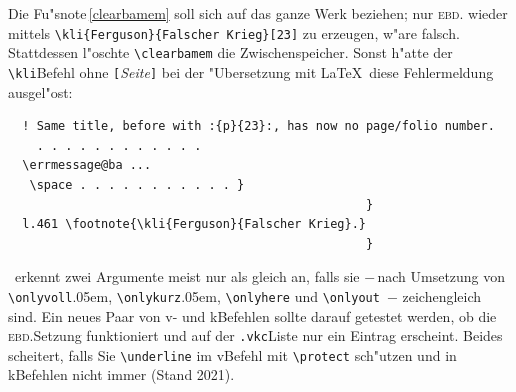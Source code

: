 \documentclass[12pt,a4paper]{article}
\begin{document}
\noindent 
Die Fu"snote\,\ref{clearbamem} soll sich auf das ganze 
Werk beziehen; nur \textsc{ebd.} \hspace{-.05em}wieder mittels 
\verb|\kli{Ferguson}{Falscher Krieg}[23]| \hspace{.05em}zu erzeugen, 
w"are falsch. Stattdessen l"oschte \hspace{-.025em}\verb|\clearbamem| die 
Zwischenspeicher. Sonst h"atte der \hspace{-.05em}\verb|\kli|\hy Befehl 
ohne \verb|[|\textit{Seite}\verb|]| bei der "Ubersetzung mit \LaTeX\ 
diese Fehlermeldung ausgel"ost:

\vspace{-0.25ex}\label{before}
{\scriptsize\begin{verbatim}
  ! Same title, before with :{p}{23}:, has now no page/folio number.
    . . . . . . . . . . . .
  \errmessage@ba ...
   \space . . . . . . . . . . . }
                                                  }
  l.461 \footnote{\kli{Ferguson}{Falscher Krieg}.}
                                                  }
\end{verbatim}}

\vspace{-.5ex}\noindent
\BibArts\ erkennt zwei Argumente meist nur als gleich an, falls sie 
$-$\,nach Umsetzung von \hspace{-.05em}\verb|\onlyvoll|\kern.05em, \hspace{-.075em}\verb|\onlykurz|\kern.05em, 
\hspace{-.075em}\verb|\onlyhere| und \verb|\onlyout| \baref{onlyhere}\,$-$
zeichengleich sind. Ein neues Paar von v- und k\fhy Befehlen sollte darauf
getestet werden, ob die \textsc{ebd.}\hy Setzung funktioniert und 
auf der \hspace{-.25em}\verb|.vkc|\hy Liste nur ein Eintrag erscheint. 
Beides scheitert, falls Sie \hspace{-.125em}\verb|\underline| \label{underline} 
im v\fhy Befehl mit \verb|\protect| sch"utzen \baref{zrbr} und in 
k\fhy Befehlen nicht immer (Stand 2021).
\end{document}
